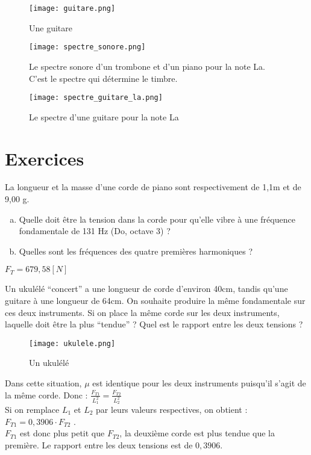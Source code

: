 \begin{figure}[h!]
    \centering
    \texttt{[image: guitare.png]}
    \caption{Une guitare}
\end{figure}

\newpage

\begin{figure}[h!]
    \texttt{[image: spectre\_sonore.png]}
    \caption{Le spectre sonore d'un trombone et d'un piano pour la note La. C'est le spectre qui détermine le timbre.}
\end{figure}

\begin{figure}[h!]
    \texttt{[image: spectre\_guitare\_la.png]}
    \caption{Le spectre d'une guitare pour la note La}
\end{figure}

\newpage

\section{Exercices}
\begin{exercise}
    La longueur et la masse d'une corde de piano sont respectivement de 1,1m et de 9,00 g.
    \begin{enumerate}[a)]
        \item Quelle doit être la tension dans la corde pour qu'elle vibre à une fréquence fondamentale de 131 Hz (Do, octave 3) ?
        \item Quelles sont les fréquences des quatre premières harmoniques ?
    \end{enumerate}
\end{exercise}
\begin{solution}
    \(F_T=679,58[N]\)
\end{solution}

\begin{exercise}
    Un ukulélé \enquote{concert} a une longueur de corde d'environ 40cm, tandis qu'une guitare à une longueur de 64cm. On souhaite produire la même fondamentale sur ces deux instruments. Si on place la même corde sur les deux instruments, laquelle doit être la plus \enquote{tendue} ? Quel est le rapport entre les deux tensions ?
    \begin{figure}[h!]
        \centering
        \texttt{[image: ukulele.png]}
        \caption{Un ukulélé}
    \end{figure}
\end{exercise}
\begin{solution}
    Dans cette situation, \(\mu\) est identique pour les deux instruments puisqu'il s'agit de la même corde. Donc :
    \(\frac{F_{T1}}{L_1 ^2}=\frac{F_{T2}}{L_2 ^2}\) \\
    Si on remplace \(L_1\) et \(L_2\) par leurs valeurs respectives, on obtient :\\
    \(F_{T1}=0,3906 \cdot F_{T2}\) .\\
    \(F_{T1}\) est donc plus petit que \(F_{T2}\), la deuxième corde est plus tendue que la première. Le rapport entre les deux tensions est de \(0,3906\).
\end{solution}


